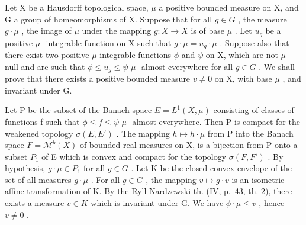 Let X be a Hausdorff topological space, \(\mu\) a positive bounded measure on X, and G a group of homeomorphisms of X. Suppose that for all \(g \in G\) , the measure \(g \cdot \mu\) , the image of \(\mu\) under the mapping \(g : X \to X\) is of base \(\mu\) . Let \(u_g\) be a positive \(\mu\) -integrable function on X such that \(g \cdot \mu = u_g \cdot \mu\) . Suppose also that there exist two positive \(\mu\) integrable functions \(\phi\) and \(\psi\) on X, which are not \(\mu\) -null and are such that \(\phi \leqslant u_g \leqslant \psi\) \(\mu\) -almost everywhere for all \(g \in G\) . We shall prove that there exists a positive bounded measure \(v \neq 0\) on X, with base \(\mu\) , and invariant under G.

Let P be the subset of the Banach space \(E = L^{1}(X, \mu)\) consisting of classes of functions f such that \(\phi \leqslant f \leqslant \psi\) \(\mu\) -almost everywhere. Then P is compact for the weakened topology \(\sigma(E, E')\) . The mapping \(h \mapsto h \cdot \mu\) from P into the Banach space \(F = \mathcal{M}^{b}(X)\) of bounded real measures on X, is a bijection from P onto a subset \(P_{1}\) of E which is convex and compact for the topology \(\sigma(F, F')\) . By hypothesis, \(g \cdot \mu \in P_{1}\) for all \(g \in G\) . Let K be the closed convex envelope of the set of all measures \(g \cdot \mu\) . For all \(g \in G\) , the mapping \(v \mapsto g \cdot v\) is an isometric affine transformation of K. By the Ryll-Nardzewski th. (IV, p.~43, th. 2), there exists a measure \(v \in K\) which is invariant under G. We have \(\phi \cdot \mu \leqslant v\) , hence \(v \neq 0\) .

\closechapterappendix
